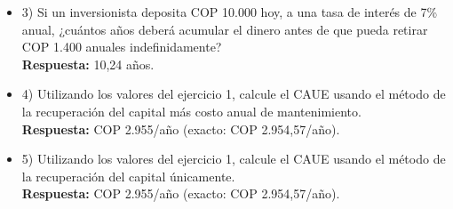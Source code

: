 \begin{itemize}
 \item 3) Si un inversionista deposita COP 10.000 hoy, a una tasa de interés de 7\% anual, ¿cuántos años deberá acumular el dinero antes de que pueda retirar COP 1.400 anuales indefinidamente?\\
       \textbf{Respuesta:} 10,24 años.
       \medskip

 \item 4) Utilizando los valores del ejercicio 1, calcule el CAUE usando el método de la recuperación del capital más costo anual de mantenimiento.\\
       \textbf{Respuesta:} COP 2.955/año (exacto: COP 2.954,57/año).
       \medskip

 \item 5) Utilizando los valores del ejercicio 1, calcule el CAUE usando el método de la recuperación del capital únicamente.\\
       \textbf{Respuesta:} COP 2.955/año (exacto: COP 2.954,57/año).
       \medskip

\end{itemize}
